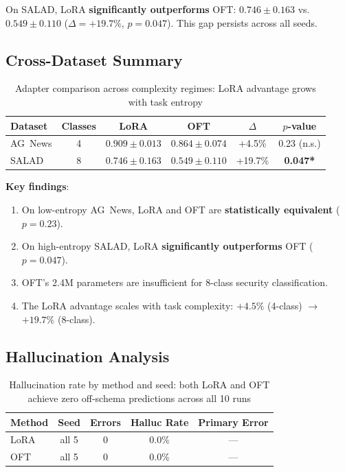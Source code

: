 \documentclass[review,3p]{elsarticle}
\begin{document}
On SALAD, LoRA \textbf{significantly outperforms} OFT: $0.746 \pm 0.163$ vs.\ $0.549 \pm 0.110$ ($\Delta = +19.7\%$, $p = 0.047$). This gap persists across all seeds.

\subsection{Cross-Dataset Summary}

\begin{table}[!ht]
\centering\caption{Adapter comparison across complexity regimes: LoRA advantage grows with task entropy}
\label{tab:cross_dataset}
\begin{tabular}{lccccc}
\toprule \textbf{Dataset} & \textbf{Classes} & \textbf{LoRA} & \textbf{OFT} & $\Delta$ & \textbf{$p$-value} \\
\midrule
AG~News & 4 & $0.909 \pm 0.013$ & $0.864 \pm 0.074$ & +4.5\% & 0.23 (n.s.) \\
SALAD & 8 & $\mathbf{0.746 \pm 0.163}$ & $0.549 \pm 0.110$ & +19.7\% & \textbf{0.047*} \\
\bottomrule
\end{tabular}
\end{table}

\textbf{Key findings}:
\begin{enumerate}
\item On low-entropy AG~News, LoRA and OFT are \textbf{statistically equivalent} ($p=0.23$).
\item On high-entropy SALAD, LoRA \textbf{significantly outperforms} OFT ($p=0.047$).
\item OFT's 2.4M parameters are insufficient for 8-class security classification.
\item The LoRA advantage scales with task complexity: $+4.5\%$ (4-class) $\to$ $+19.7\%$ (8-class).
\end{enumerate}

\subsection{Hallucination Analysis}

\begin{table}[!ht]
\centering\caption{Hallucination rate by method and seed: both LoRA and OFT achieve zero off-schema predictions across all 10 runs}
\label{tab:halluc}
\begin{tabular}{lcccc}
\toprule
\textbf{Method} & \textbf{Seed} & \textbf{Errors} & \textbf{Halluc Rate} & \textbf{Primary Error} \\
\midrule
LoRA & all 5 & 0 & 0.0\% & --- \\
OFT  & all 5 & 0 & 0.0\% & --- \\
\bottomrule
\end{tabular}
\end{table}
\end{document}
